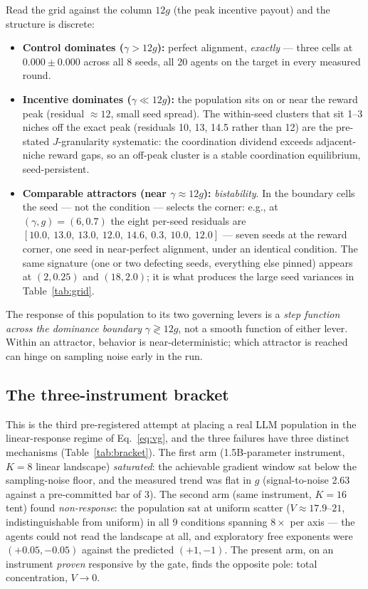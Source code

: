 \documentclass{article} %
\begin{document}
Read the grid against the column $12g$ (the peak incentive payout) and the structure is discrete:
\begin{itemize}
\item \textbf{Control dominates ($\gamma > 12g$):} perfect alignment, \emph{exactly} --- three cells at $0.000 \pm 0.000$ across all 8 seeds, all 20 agents on the target in every measured round.
\item \textbf{Incentive dominates ($\gamma \ll 12g$):} the population sits on or near the reward peak (residual $\approx 12$, small seed spread). The within-seed clusters that sit 1--3 niches off the exact peak (residuals 10, 13, 14.5 rather than 12) are the pre-stated $J$-granularity systematic: the coordination dividend exceeds adjacent-niche reward gaps, so an off-peak cluster is a stable coordination equilibrium, seed-persistent.
\item \textbf{Comparable attractors (near $\gamma \approx 12g$):} \emph{bistability}. In the boundary cells the seed --- not the condition --- selects the corner: e.g., at $(\gamma, g) = (6, 0.7)$ the eight per-seed residuals are $[10.0,\ 13.0,\ 13.0,\ 12.0,\ 14.6,\ \mathbf{0.3},\ 10.0,\ 12.0]$ --- seven seeds at the reward corner, one seed in near-perfect alignment, under an identical condition. The same signature (one or two defecting seeds, everything else pinned) appears at $(2, 0.25)$ and $(18, 2.0)$; it is what produces the large seed variances in Table~\ref{tab:grid}.
\end{itemize}
The response of this population to its two governing levers is a \emph{step function across the dominance boundary} $\gamma \gtrless 12g$, not a smooth function of either lever. Within an attractor, behavior is near-deterministic; which attractor is reached can hinge on sampling noise early in the run.

\subsection{The three-instrument bracket}
\label{sec:bracket}

This is the third pre-registered attempt at placing a real LLM population in the linear-response regime of Eq.~\ref{eq:vg}, and the three failures have three distinct mechanisms (Table~\ref{tab:bracket}). The first arm (1.5B-parameter instrument, $K = 8$ linear landscape) \emph{saturated}: the achievable gradient window sat below the sampling-noise floor, and the measured trend was flat in $g$ (signal-to-noise 2.63 against a pre-committed bar of 3). The second arm (same instrument, $K = 16$ tent) found \emph{non-response}: the population sat at uniform scatter ($V \approx 17.9$--$21$, indistinguishable from uniform) in all 9 conditions spanning $8\times$ per axis --- the agents could not read the landscape at all, and exploratory free exponents were $(+0.05, -0.05)$ against the predicted $(+1, -1)$. The present arm, on an instrument \emph{proven} responsive by the gate, finds the opposite pole: total concentration, $V \to 0$.
\end{document}
